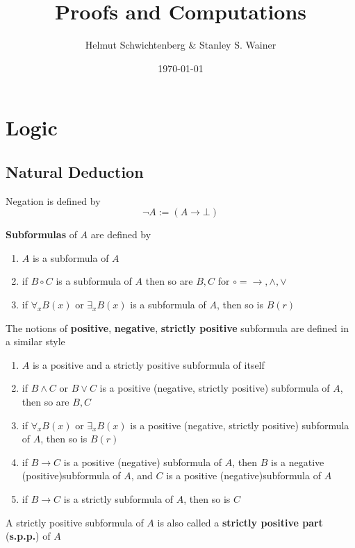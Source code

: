 \documentclass[11pt]{article}
\author{Helmut Schwichtenberg \& Stanley S. Wainer}
\date{\today}
\title{Proofs and Computations}
\begin{document}
\maketitle
\tableofcontents

\section{Logic}
\label{sec:org8e3244c}

\subsection{Natural Deduction}
\label{sec:org94529aa}
Negation is defined by
\begin{equation*}
\neg A:=(A\to\bot)
\end{equation*}

\begin{definition}[Gentzen]
\textbf{Subformulas} of \(A\) are defined by
\begin{enumerate}
\item \(A\) is a subformula of \(A\)
\item if \(B\circ C\) is a subformula of \(A\) then so are \(B,C\) for \(\circ=\to,\wedge,\vee\)
\item if \(\forall_xB(x)\) or \(\exists_xB(x)\) is a subformula of \(A\), then
so is \(B(r)\)
\end{enumerate}
\end{definition}



\begin{definition}[]
The notions of \textbf{positive}, \textbf{negative}, \textbf{strictly positive} subformula are defined
in a similar style
\begin{enumerate}
\item \(A\) is a positive and a strictly positive subformula of itself
\item if \(B\wedge C\) or \(B\vee C\) is a positive (negative, strictly
positive) subformula of \(A\), then so are \(B, C\)
\item if \(\forall_xB(x)\) or \(\exists_xB(x)\) is a positive (negative,
strictly positive) subformula of \(A\), then so is \(B(r)\)
\item if \(B\to C\) is a positive (negative) subformula of
\(A\), then \(B\) is a negative (positive)subformula of \(A\), and \(C\)
is a positive (negative)subformula of \(A\)
\item if \(B\to C\) is a strictly subformula of \(A\), then so is \(C\)
\end{enumerate}


A strictly positive subformula of \(A\) is also called a \textbf{strictly positive
part} (\textbf{s.p.p.}) of \(A\)
\end{definition}
\end{document}
